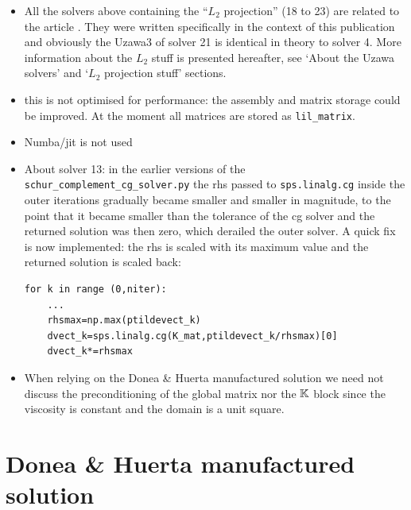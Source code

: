 \begin{itemize}
\item All the solvers above containing the ``$L_2$ projection'' (18 to 23) are related to the 
article \textcite{jalt26}. They were written specifically in the context of this publication 
and obviously the Uzawa3 of solver 21 is identical in theory to solver 4. 
More information about the $L_2$ stuff is presented hereafter, see `About the Uzawa solvers' 
and `$L_2$ projection stuff' sections.

\item this \stone is not optimised for performance: the assembly and matrix storage could 
be improved. At the moment all matrices are stored as \lstinline{lil_matrix}.

\item Numba/jit is not used 

\item About solver 13: in the earlier versions of the {\tt schur\_complement\_cg\_solver.py} 
the rhs passed to {\tt sps.linalg.cg} inside the outer iterations gradually became  
smaller and smaller in magnitude, to the point that it became smaller than the tolerance 
of the cg solver and the returned solution was then zero, which derailed the outer solver.
A quick fix is now implemented: the rhs is scaled with its maximum value and the returned 
solution is scaled back:
\begin{lstlisting}
for k in range (0,niter):
    ...
    rhsmax=np.max(ptildevect_k)
    dvect_k=sps.linalg.cg(K_mat,ptildevect_k/rhsmax)[0]
    dvect_k*=rhsmax
\end{lstlisting}

\item When relying on the Donea \& Huerta manufactured solution 
we need not discuss the preconditioning of the 
global matrix nor the ${\mathbb{K}}$ block since the viscosity is constant 
and the domain is a unit square.


\end{itemize}

\newpage
\section*{Donea \& Huerta manufactured solution}

